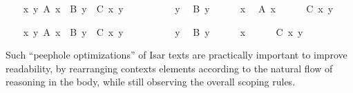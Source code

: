 \begin{isabellebody}
\begin{minipage}{0.5\textwidth}
\ \ \isamarkupfalse%
\ {\isachardoublequoteopen}{\isasymAnd}x\ y{\isachardot}\ A\ x\ {\isasymLongrightarrow}\ B\ y\ {\isasymLongrightarrow}\ C\ x\ y{\isachardoublequoteclose}\isanewline
\ \ \isamarkupfalse%
\ {\isacharminus}\isanewline
\ \ \ \ \isamarkupfalse%
\ y\ \isamarkupfalse%
\ {\isachardoublequoteopen}B\ y{\isachardoublequoteclose}\isanewline
\ \ \ \ \isamarkupfalse%
\ x\ \isamarkupfalse%
\ {\isachardoublequoteopen}A\ x{\isachardoublequoteclose}\isanewline
\ \ \ \ \isamarkupfalse%
\ {\isachardoublequoteopen}C\ x\ y{\isachardoublequoteclose}\ \isamarkupfalse%
\isanewline
\ \ \isamarkupfalse%
%
\end{minipage}\begin{minipage}{0.5\textwidth}
\ \ \isamarkupfalse%
\ {\isachardoublequoteopen}{\isasymAnd}x\ y{\isachardot}\ A\ x\ {\isasymLongrightarrow}\ B\ y\ {\isasymLongrightarrow}\ C\ x\ y{\isachardoublequoteclose}\isanewline
\ \ \isamarkupfalse%
\ {\isacharminus}\isanewline
\ \ \ \ \isamarkupfalse%
\ y\ \isamarkupfalse%
\ {\isachardoublequoteopen}B\ y{\isachardoublequoteclose}\isanewline
\ \ \ \ \isamarkupfalse%
\ x\isanewline
\ \ \ \ \isamarkupfalse%
\ {\isachardoublequoteopen}C\ x\ y{\isachardoublequoteclose}\ \isamarkupfalse%
\isanewline
\ \ \isamarkupfalse%
%
\endisatagproof
{\isafoldproof}%
%
\isadelimproof
%
\endisadelimproof
%
\end{minipage}
%
\begin{isamarkuptext}%
\medskip Such ``peephole optimizations'' of Isar texts are
  practically important to improve readability, by rearranging
  contexts elements according to the natural flow of reasoning in the
  body, while still observing the overall scoping rules.


\end{isamarkuptext}
\end{isabellebody}
